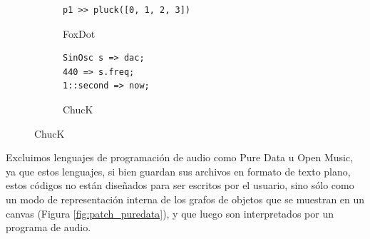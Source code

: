 \begin{figure}[h]
    \vspace{5mm} %
    
    \begin{subfigure}{.48\textwidth}
      \centering
      \begin{mdframed}
      \fontsize{9.5pt}{11pt}\selectfont
      \begin{verbatim}
p1 >> pluck([0, 1, 2, 3])
      \end{verbatim}
      \end{mdframed}
      \caption{FoxDot}
    \end{subfigure}\hfill
    \begin{subfigure}{.48\textwidth}
      \centering
      \begin{mdframed}
      \fontsize{9.5pt}{11pt}\selectfont
      \begin{verbatim}
SinOsc s => dac;
440 => s.freq;
1::second => now;
      \end{verbatim}
      \end{mdframed}
      \caption{ChucK}
    \end{subfigure}

    \label{fig:hola_mundo}
\end{figure}

Excluimos lenguajes de programación de audio como Pure Data u Open Music, ya que estos lenguajes, si bien guardan sus archivos en formato de texto plano, estos códigos no están diseñados para ser escritos por el usuario, sino sólo como un modo de representación interna de los grafos de objetos que se muestran en un canvas (Figura \ref{fig:patch_puredata}), y que luego son interpretados por un programa de audio. 

